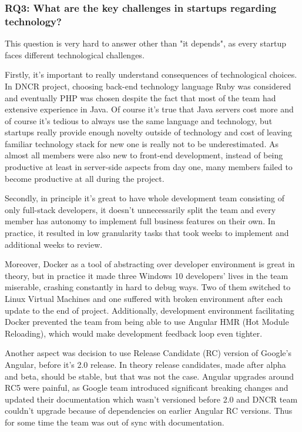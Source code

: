 \documentclass{article}
\begin{document}
\subsubsection{RQ3: What are the key challenges in startups regarding technology?}
This question is very hard to answer other than "it depends", as every startup faces different technological challenges.

Firstly, it's important to really understand consequences of technological choices. In DNCR project, choosing back-end technology language Ruby was considered and eventually PHP was chosen despite the fact that most of the team had extensive experience in Java. Of course it's true that Java servers cost more and of course it's tedious to always use the same language and technology, but startups really provide enough novelty outside of technology and cost of leaving familiar technology stack for new one is really not to be underestimated. As almost all members were also new to front-end development, instead of being productive at least in server-side aspects from day one, many members failed to become productive at all during the project.

Secondly, in principle it's great to have whole development team consisting of only full-stack developers, it doesn't unnecessarily split the team and every member has autonomy to implement full business features on their own. In practice, it resulted in low granularity tasks that took weeks to implement and additional weeks to review.

Moreover, Docker as a tool of abstracting over developer environment is great in theory, but in practice it made three Windows 10 developers' lives in the team miserable, crashing constantly in hard to debug ways. Two of them switched to Linux Virtual Machines and one suffered with broken environment after each update to the end of project. Additionally, development environment facilitating Docker prevented the team from being able to use Angular HMR (Hot Module Reloading), which would make development feedback loop even tighter.

Another aspect was decision to use Release Candidate (RC) version of Google's Angular, before it's 2.0 release. In theory release candidates, made after alpha and beta, should be stable, but that was not the case. Angular upgrades around RC5 were painful, as Google team introduced significant breaking changes and updated their documentation which wasn't versioned before 2.0 and DNCR team couldn't upgrade because of dependencies on earlier Angular RC versions. Thus for some time the team was out of sync with documentation.
\end{document}
